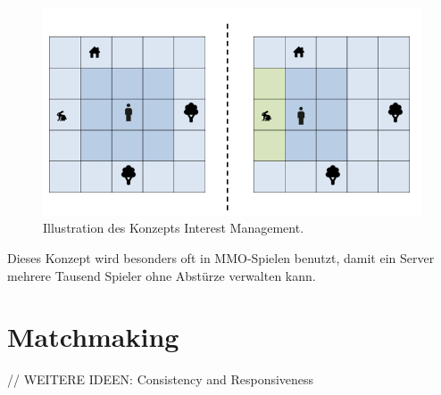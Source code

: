 \begin{figure}
	\centering
	\includegraphics[width=150mm]{images/interest_management.png}
	\caption[Interest Management]{Illustration des Konzepts Interest Management. \cite{JeromeRenaux.2017} }
	\label{pic:interest_management}
\end{figure}

Dieses Konzept wird besonders oft in MMO-Spielen benutzt, damit ein Server mehrere Tausend Spieler ohne Abstürze verwalten kann. 

\cite{Smed.2002c}


\section{Matchmaking}


// WEITERE IDEEN: Consistency and Responsiveness